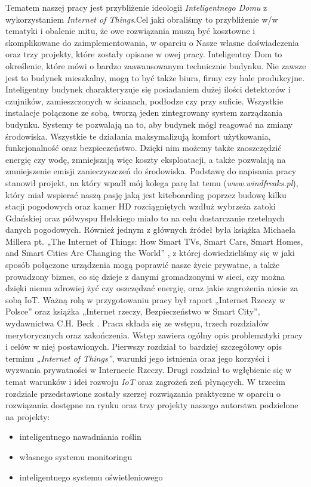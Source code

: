 \documentclass[brudnopis]{xmgr}
\begin{document}
Tematem naszej pracy jest przybliżenie ideologii \emph{Inteligentnego Domu} z wykorzystaniem \emph{Internet of Things}.Cel jaki obraliśmy to przybliżenie w/w tematyki i obalenie mitu, że owe rozwiązania muszą być kosztowne i skomplikowane do zaimplementowania, w oparciu o Nasze własne doświadczenia oraz trzy projekty, które zostały opisane w owej pracy. Inteligentny Dom to określenie, które mówi o bardzo zaawansowanym technicznie budynku. Nie zawsze jest to budynek mieszkalny, mogą to być także  biura, firmy czy hale produkcyjne. 
Inteligentny budynek charakteryzuje się posiadaniem dużej ilości detektorów i czujników, zamieszczonych w ścianach, podłodze czy przy suficie. Wszystkie instalacje połączone ze sobą, tworzą jeden zintegrowany system zarządzania budynku. Systemy te pozwalają na to, aby budynek mógł reagować na zmiany środowiska. Wszystkie te działania maksymalizują komfort użytkowania, funkcjonalność oraz bezpieczeństwo. Dzięki nim możemy także zaoszczędzić energię czy wodę, zmniejszają więc koszty eksploatacji, a także pozwalają na zmniejszenie emisji zanieczyszczeń do środowiska. 
Podstawę do napisania pracy stanowił projekt, na który wpadł mój kolega parę lat temu (\emph{www.windfreaks.pl}), który miał wspierać naszą pasję jaką jest kiteboarding poprzez budowę kilku stacji pogodowych oraz kamer HD rozciągniętych wzdłuż wybrzeża zatoki Gdańskiej oraz półwyspu Helskiego miało to na celu dostarczanie rzetelnych danych pogodowych.  Również jednym z głównych źródeł była książka Michaela Millera pt. „The Internet of Things: How Smart TVs, Smart Cars, Smart Homes, and Smart Cities Are Changing the World” \cite{MM:2015:TIOT}, z której dowiedzieliśmy się w jaki sposób połączone urządzenia mogą poprawić nasze życie prywatne, a także prowadzony biznes, co się dzieje z danymi gromadzonymi w sieci, czy można dzięki niemu zdrowiej żyć czy oszczędzać energię, oraz jakie zagrożenia niesie za sobą IoT. Ważną rolą w przygotowaniu pracy był raport „Internet Rzeczy w Polsce” \cite{RP:2015:IOTPL} oraz książka „Internet rzeczy, Bezpieczeństwo w Smart City”, wydawnictwa C.H. Beck \cite{beck}. 
Praca składa się ze wstępu, trzech rozdziałów merytorycznych oraz zakończenia. Wstęp zawiera ogólny opis problematyki pracy i celów w niej postawionych. Pierwszy rozdział to bardziej szczegółowy opis terminu \emph{„Internet of Things”}, warunki jego istnienia oraz jego korzyści i wyzwania prywatności w Internecie Rzeczy. Drugi rozdział to wgłębienie się w temat warunków i idei rozwoju \emph{IoT} oraz zagrożeń zeń płynących.  W trzecim rozdziale przedstawione zostały szerzej rozwiązania praktyczne w oparciu o rozwiązania dostępne na rynku oraz trzy projekty naszego autorstwa podzielone na projekty:
\begin{itemize}
\item inteligentnego nawadniania roślin
\item własnego systemu monitoringu
\item inteligentnego systemu oświetleniowego
\end{itemize}
\end{document}
